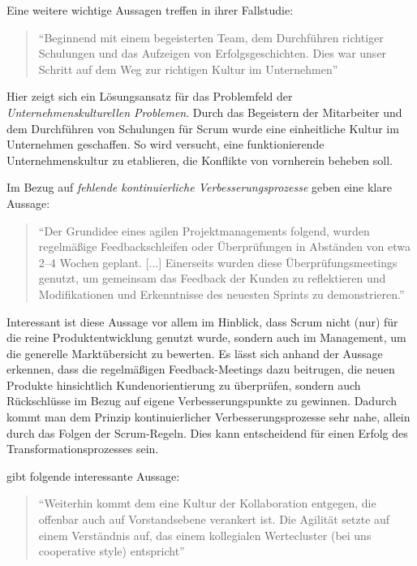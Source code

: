 Eine weitere wichtige Aussagen treffen  in ihrer Fallstudie:

\begin{quote}
	``Beginnend mit einem begeisterten Team, dem Durchführen richtiger Schulungen und das Aufzeigen von Erfolgsgeschichten. Dies war unser Schritt auf dem Weg zur richtigen Kultur im Unternehmen'' \cite[S. 2]{anwar_agile_2016}
\end{quote}

Hier zeigt sich ein Lösungsansatz für das Problemfeld der \textit{Unternehmenskulturellen Problemen}. Durch das Begeistern der Mitarbeiter und dem Durchführen von Schulungen für Scrum wurde eine einheitliche Kultur im Unternehmen geschaffen. So wird versucht, eine funktionierende Unternehmenskultur zu etablieren, die Konflikte von vornherein beheben soll.

Im Bezug auf \textit{fehlende kontinuierliche Verbesserungsprozesse} geben  eine klare Aussage:

\begin{quote}
	``Der Grundidee eines agilen Projektmanagements folgend, wurden regelmäßige Feedbackschleifen oder Überprüfungen in Abständen von etwa 2–4 Wochen geplant. [...] Einerseits wurden diese Überprüfungsmeetings genutzt, um gemeinsam das Feedback der Kunden zu reflektieren und Modifikationen und Erkenntnisse des neuesten Sprints zu demonstrieren.'' \cite[S. 146]{urbach_digitalization_2018}
\end{quote}

Interessant ist diese Aussage vor allem im Hinblick, dass Scrum nicht (nur) für die reine Produktentwicklung genutzt wurde, sondern auch im Management, um die generelle Marktübersicht zu bewerten. Es lässt sich anhand der Aussage erkennen, dass die regelmäßigen Feedback-Meetings dazu beitrugen, die neuen Produkte hinsichtlich Kundenorientierung zu überprüfen, sondern auch Rückschlüsse im Bezug auf eigene Verbesserungspunkte zu gewinnen. Dadurch kommt man dem Prinzip kontinuierlicher Verbesserungsprozesse sehr nahe, allein durch das Folgen der Scrum-Regeln. Dies kann entscheidend für einen Erfolg des Transformationsprozesses sein.

 gibt folgende interessante Aussage: 

\begin{quote}
	``Weiterhin kommt dem eine Kultur der Kollaboration entgegen, die offenbar auch auf Vorstandsebene verankert ist. Die Agilität setzte auf einem Verständnis auf, das einem kollegialen Wertecluster (bei uns cooperative style) entspricht'' \cite[S. 210]{hofert_agile_2018}
\end{quote}

